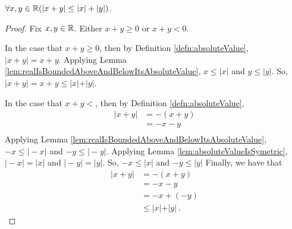 \begin{lem}
\label{lem:triangleInequalityForReals}
  $\forall x,y\in\mathbb{R}(\vert x + y \vert \leq \vert x \vert + \vert y \vert)$.
\end{lem}
\begin{proof}
  Fix $x,y\in\mathbb{R}$.
  Either $x+y\geq 0$ or $x+y<0$.

  In the case that $x+y\geq0$, then by Definition \ref{defn:absoluteValue}, $\vert x + y\vert = x + y$.
  Applying Lemma \ref{lem:realIsBoundedAboveAndBelowItsAbsoluteValue}, $x\leq\vert x\vert$ and $y\leq\vert y\vert$.
  So, $\vert x+y\vert = x + y \leq \vert x\vert + \vert y\vert$.

  In the case that $x+y<$, then by Definition \ref{defn:absoluteValue},
  \begin{align*}
    \vert x + y\vert  &= -(x + y)\\
                      &= -x -y \\
  \end{align*}
  Applying Lemma \ref{lem:realIsBoundedAboveAndBelowItsAbsoluteValue}, $-x\leq\vert -x \vert$ and $-y\leq\vert-y\vert$.
  Applying Lemma \ref{lem:absoluteValueIsSymetric}, $\vert -x \vert=\vert x\vert$ and $\vert -y \vert=\vert y\vert$.
  So, $-x\leq\vert x \vert$ and $-y\leq\vert y\vert$
  Finally, we have that
  \begin{align*}
    \vert x + y\vert  &= -(x + y) \\
                      &= -x -y  \\
                      &= -x + (-y) \\
                      &\leq \vert x\vert + \vert y \vert \,.
  \end{align*}
\end{proof}
